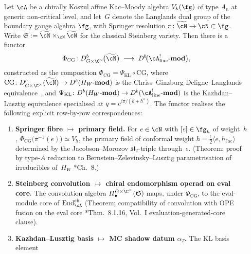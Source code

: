 \begin{proposition}
\label{prop:chriss-ginzburg-functor}
Let $\cA$ be a chirally Koszul affine Kac--Moody algebra
$V_k(\fg)$ of type $A_n$ at generic non-critical level,
and let~$G$ denote the Langlands dual group of the boundary
gauge algebra $\fg$, with Springer resolution
$\pi\colon \widetilde{\cN} \to \cN \subset \fg$. Write
$\mathfrak{S} := \widetilde{\cN} \times_{\cN} \widetilde{\cN}$
for the classical Steinberg variety. Then there is a functor
\[
 \Phi_{\mathrm{CG}} \colon
 D^b_{G\times \C^\times}\!\bigl(\widetilde{\cN}\bigr)
 \;\longrightarrow\;
 D^b\!\bigl(\cA^!_{\mathrm{line}}\text{-}\mathbf{mod}\bigr),
\]
constructed as the composition
$\Phi_{\mathrm{CG}} = \Psi_{\mathrm{KL}} \circ \mathrm{CG}$, where
$\mathrm{CG}\colon D^b_{G\times\C^\times}(\widetilde{\cN})
\to D^b(H_W\text{-}\mathbf{mod})$ is the Chriss--Ginzburg
Deligne--Langlands equivalence~\cite{CG97}, and
$\Psi_{\mathrm{KL}}\colon D^b(H_W\text{-}\mathbf{mod})
\to D^b(\cA^!_{\mathrm{line}}\text{-}\mathbf{mod})$
is the Kazhdan--Lusztig equivalence
\cite{KL1,KL2,KL3,KL4} specialised at
$q = e^{i\pi/(k+h^\vee)}$. The functor realises the following
explicit row-by-row correspondences:
\begin{enumerate}
\item[\textup{(R1)}]
 \textbf{Springer fibre $\mapsto$ primary field.}
 For $e \in \cN$ with $[e]\in \fg_h$ of weight~$h$,
 $\Phi_{\mathrm{CG}}\bigl(\pi^{-1}(e)\bigr)
 \simeq V_h$, the primary field of conformal weight
 $h = \tfrac{1}{2}\langle e, h_{\mathrm{Jac}}\rangle$
 determined by the Jacobson--Morozov $\mathfrak{sl}_2$-triple
 through~$e$. (Theorem; proof by type-$A$ reduction to
 Bernstein--Zelevinsky--Lusztig parametrisation of irreducibles
 of~$H_W$ \cite{CG97}*{Ch.\ 8}.)
\item[\textup{(R2)}]
 \textbf{Steinberg convolution $\mapsto$ chiral endomorphism
 operad on eval core.} The convolution algebra
 $H^{G\times\C^\times}_\bullet(\mathfrak{S})$ maps, under
 $\Phi_{\mathrm{CG}}$, to the eval-module core of
 $\operatorname{End}^{\mathrm{ch}}_{\cA}$ (Theorem;
 compatibility of convolution with OPE fusion on the
 eval core \cite{CG97}*{Thm.\ 8.1.16}, Vol.~I evaluation-generated-core clause).
\item[\textup{(R3)}]
 \textbf{Kazhdan--Lusztig basis $\mapsto$ MC shadow datum
 $\alpha_T$.} The KL basis element

\end{enumerate}
\end{proposition}
